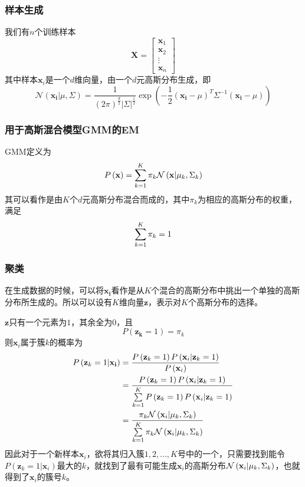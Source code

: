 \subsubsection{样本生成}

我们有$n$个训练样本
\begin{equation}
    \mathbf{X}=
    \begin{bmatrix}
        \mathbf{x}_1 \\ \mathbf{x}_2 \\ \vdots \\ \mathbf{x}_n
    \end{bmatrix}
\end{equation}
其中样本$\mathbf{x}_i$是一个$d$维向量，由一个$d$元高斯分布生成，即
\begin{equation}
    \mathcal{N}\left(\mathbf{x_i}|\mu,\Sigma\right)=
    \dfrac{1}{\left(2\pi\right)^{\frac{d}{2}}|\Sigma|^{\frac{1}{2}}}\exp\left(-\dfrac{1}{2}\left(\mathbf{x_i}-\mu\right)^T\Sigma^{-1}\left(\mathbf{x_i}-\mu\right)\right)
\end{equation}

\subsubsection{用于高斯混合模型GMM的EM}

GMM定义为
\begin{equation}
    P\left(\mathbf{x}\right)=\sum\limits^K_{k=1}\pi_k\mathcal{N}\left(\mathbf{x}|\mu_k,\Sigma_k\right)
\end{equation}
其可以看作是由$K$个$d$元高斯分布混合而成的，其中$\pi_k$为相应的高斯分布的权重，满足
\begin{equation}
    \label{pik}
    \sum\limits^K_{k=1}\pi_k=1
\end{equation}

\subsubsection{聚类}

在生成数据的时候，可以将$\mathbf{x_i}$看作是从$K$个混合的高斯分布中挑出一个单独的高斯分布所生成的。所以可以设有$K$维向量$\mathbf{z}$，表示对$K$个高斯分布的选择。

$\mathbf{z}$只有一个元素为$1$，其余全为$0$，且
\begin{equation}
    P\left(\mathbf{z_k}=1\right)=\pi_k
\end{equation}
则$\mathbf{x}_i$属于簇$k$的概率为
\begin{align}
    P\left(\mathbf{z}_k=1|\mathbf{x_i}\right)
    &= \dfrac{P\left(\mathbf{z}_k=1\right)P\left(\mathbf{x}_i|\mathbf{z}_k=1\right)}{P\left(\mathbf{x}_i\right)} \\
    &= \dfrac{P\left(\mathbf{z}_k=1\right)P\left(\mathbf{x}_i|\mathbf{z}_k=1\right)}{\sum\limits^K_{k=1} P\left(\mathbf{z}_k=1\right)P\left(\mathbf{x}_i|\mathbf{z}_k=1\right)} \\
    &= \dfrac{\pi_k\mathcal{N}\left(\mathbf{x}_i|\mu_k,\Sigma_k\right)}{\sum\limits^K_{k=1}\pi_k\mathcal{N}\left(\mathbf{x}_i|\mu_k,\Sigma_k\right)}
\end{align}
因此对于一个新样本$\mathbf{x}_i$，欲将其归入簇$1, 2, \ldots, K$号中的一个，只需要找到能令$P\left(\mathbf{z}_k=1|\mathbf{x}_i\right)$最大的$k$，就找到了最有可能生成$\mathbf{x}_i$的高斯分布$\mathcal{N}\left(\mathbf{x}_i|\mu_k,\Sigma_k\right)$，也就得到了$\mathbf{x}_i$的簇号$k$。

